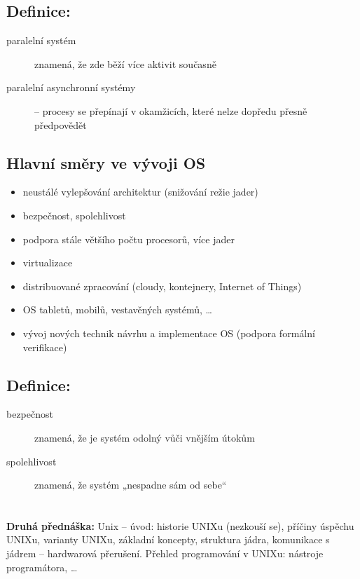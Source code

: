 \documentclass[a4paper, 11pt]{article}
\begin{document}
\subsection*{Definice:}
\begin{description}
\item[paralelní systém] znamená, že zde běží více aktivit současně
\item[paralelní asynchronní systémy] -- procesy se přepínají v okamžicích, které nelze dopředu přesně předpovědět
\end{description}

\subsection{Hlavní směry ve vývoji OS}
\begin{itemize}
    \item neustálé vylepšování architektur (snižování režie jader)
    \item bezpečnost, spolehlivost
    \item podpora stále většího počtu procesorů, více jader
    \item virtualizace
    \item distribuované zpracování (cloudy, kontejnery, Internet of Things)
    \item OS tabletů, mobilů, vestavěných systémů, \ldots
    \item vývoj nových technik návrhu a implementace OS (podpora formální verifikace)
\end{itemize}

\subsection*{Definice:}
\begin{description}
\item[bezpečnost] znamená, že je systém odolný vůči vnějším útokům
\item[spolehlivost] znamená, že systém „nespadne sám od sebe“
\end{description}


\newpage

\section{}
\textbf{Druhá přednáška:} Unix -- úvod: historie UNIXu (nezkouší se), příčiny úspěchu UNIXu, varianty UNIXu, základní koncepty, struktura jádra, komunikace s jádrem -- hardwarová přerušení. Přehled programování v UNIXu: nástroje programátora, \ldots
\end{document}
